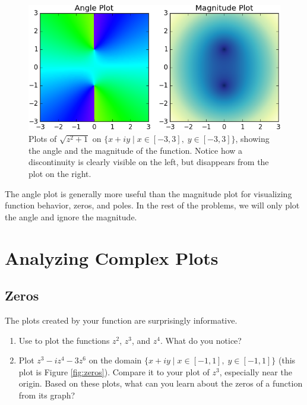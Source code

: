 \begin{figure}[H]
\includegraphics[width=\textwidth]{check_plot_magnitude.png}
\caption{Plots of $\sqrt{z^2+1}$ on $\{x+iy \mid x \in [-3,3] , \; y \in [-3,3]\}$, showing the angle and the magnitude of the function.
Notice how a discontinuity is clearly visible on the left, but disappears from the plot on the right.}
\label{fig:check_plot_2}
\end{figure}


The angle plot is generally more useful than the magnitude plot for visualizing function behavior, zeros, and poles. 
In the rest of the problems, we will only plot the angle and ignore the magnitude.

\section*{Analyzing Complex Plots}

\subsection*{Zeros}

The plots created by your function  are surprisingly informative.

\begin{problem}\label{prob:zeros}
\leavevmode
\begin{enumerate}
\item Use  to plot the functions $z^2$, $z^3$, and $z^4$. What do you notice?
\item Plot $z^3 - iz^4 - 3z^6$ on the domain $\{x+iy \mid x \in [-1,1] , \; y \in [-1,1]\}$ (this plot is Figure \ref{fig:zeros}). 
Compare it to your plot of $z^3$, especially near the origin.
Based on these plots, what can you learn about the zeros of a function from its graph?
\end{enumerate}
\end{problem}

